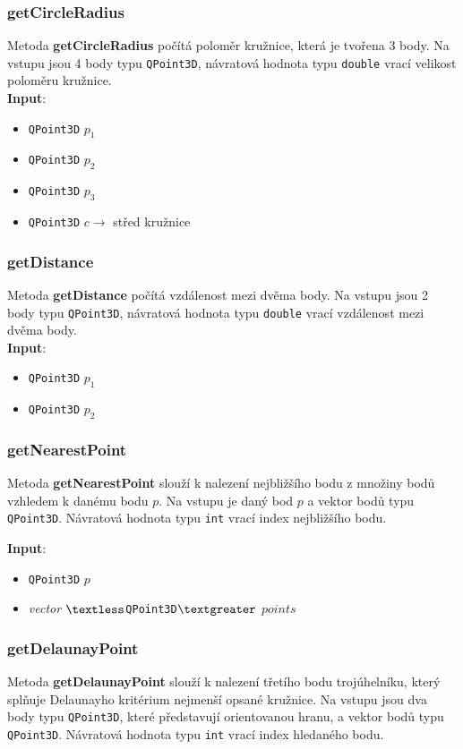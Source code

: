 \documentclass[a4paper, 12pt]{article}
\begin{document}
\subsubsection*{getCircleRadius}
Metoda \textbf{getCircleRadius} počítá poloměr kružnice, která je tvořena 3 body. Na vstupu jsou 4 body typu \texttt{QPoint3D}, návratová hodnota typu \texttt{double} vrací velikost poloměru kružnice.\\ 

\textbf{Input}:
\begin{itemize}
\item \texttt{QPoint3D} $p_1$ 
\item \texttt{QPoint3D} $p_2$ 
\item \texttt{QPoint3D} $p_3$
\item \texttt{QPoint3D} $c \rightarrow$ střed kružnice
\end{itemize}

\subsubsection*{getDistance}
Metoda \textbf{getDistance} počítá vzdálenost mezi dvěma body. Na vstupu jsou 2 body typu \texttt{QPoint3D}, návratová hodnota typu \texttt{double} vrací vzdálenost mezi dvěma body.\\ 

\textbf{Input}:
\begin{itemize}
\item \texttt{QPoint3D} $p_1$ 
\item \texttt{QPoint3D} $p_2$
\end{itemize}

\subsubsection*{getNearestPoint}
Metoda \textbf{getNearestPoint} slouží k nalezení nejbližšího bodu z množiny bodů vzhledem k danému bodu $p$. Na vstupu je daný bod $p$ a vektor bodů typu \texttt{QPoint3D}. Návratová hodnota typu \texttt{int} vrací index nejbližšího bodu.

\textbf{Input}:
\begin{itemize}
\item \texttt{QPoint3D} $p$ 
\item \textsl{vector} $\textless$\texttt{QPoint3D}$\textgreater$ $points$
\end{itemize}

\subsubsection*{getDelaunayPoint}
Metoda \textbf{getDelaunayPoint} slouží k nalezení třetího bodu trojúhelníku, který splňuje Delaunayho kritérium nejmenší opsané kružnice. Na vstupu jsou dva body typu \texttt{QPoint3D}, které představují orientovanou hranu, a vektor bodů typu \texttt{QPoint3D}. Návratová hodnota typu \texttt{int} vrací index hledaného bodu.\\
\end{document}
